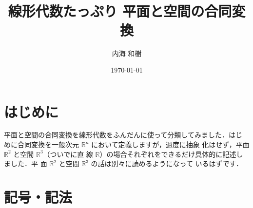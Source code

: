 \documentclass[11pt, uplatex, dvipdfmx, titlepage]{jsarticle}
\theoremstyle{definition}
\begin{document}
\title{線形代数たっぷり 平面と空間の合同変換}
\author{内海 和樹}
\date{\today}
\maketitle
  


\section*{はじめに}

平面と空間の合同変換を線形代数をふんだんに使って分類してみました．はじ
めに合同変換を一般次元 $\mathbb{R}^n$ において定義しますが，過度に抽象
化はせず，平面 $\mathbb{R}^2$ と空間 $\mathbb{R}^3$（ついでに直
線 $\mathbb{R}$）の場合それぞれをできるだけ具体的に記述しました．平
面 $\mathbb{R}^2$ と空間 $\mathbb{R}^3$ の話は別々に読めるようになって
いるはずです．

 
 \newpage

 \section*{記号・記法}
\end{document}
